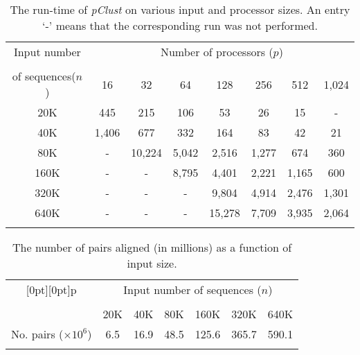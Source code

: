 
\begin{table*}[thb]
\begin{center}
\begin{tabular}{cccccccc}
\colrule
Input number & \multicolumn{7}{c}{Number of processors ($p$)}\\[2pt]  \cline{2-8} \\[-7pt]
\multicolumn{1}{c}{of sequences($n$)} & 16 & 32 & 64 & 128 & 256 & 512 & 1,024\\
 \colrule
 20K & 445 & 215 & 106 & 53 & 26 & 15 & -  \\
 40K & 1,406 & 677 & 332  & 164 & 83 & 42 &  21 \\
 80K & -  & 10,224  & 5,042 & 2,516 & 1,277 & 674 & 360  \\
 160K & -  & - & 8,795 & 4,401 & 2,221  & 1,165  & 600  \\
 320K & - & - &  - & 9,804 & 4,914 & 2,476 & 1,301  \\
 640K & - & - & - & 15,278 & 7,709  & 3,935  & 2,064  \\
 \colrule
\end{tabular}
\end{center}
\caption{\label{tabRuntime}
The run-time of \emph{pClust} on various input and processor sizes. An entry `-' means that the corresponding run was not performed.
}
\end{table*}

\begin{table}[h]
\begin{center}
\begin{tabular}{ccccccc}
 \colrule
  \raisebox{-5pt}[0pt][0pt]{p}\hfill & \multicolumn{6}{c}{Input number of sequences ($n$)}\\[2pt]  \cline{2-7} \\[-7pt]
  & 20K & 40K & 80K & 160K & 320K & 640K \\
 \colrule
 No. pairs ($\times 10^6$) & 6.5 & 16.9 & 48.5 & 125.6 & 365.7 & 590.1  \\
 \colrule
\end{tabular}
\end{center}
\caption{\label{tabPairsAligned}
The number of pairs aligned (in millions) as a function of input size.
}
\end{table}

